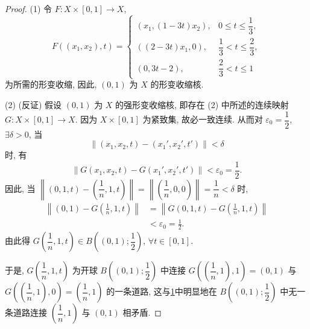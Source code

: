 \begin{proof}
(1) 令 $F\colon X \times [0, 1] \to X$,
\[
  F((x_{1}, x_{2}), t) = \begin{cases}
    (x_{1}, (1 - 3t)x_{2}), & 0 \leqslant t \leqslant \dfrac{1}{3},\\[6pt]
    ((2 - 3t)x_{1}, 0), & \dfrac{1}{3} < t \leqslant \dfrac{2}{3},\\[6pt]
    (0, 3t - 2), & \dfrac{2}{3} < t \leqslant 1
  \end{cases}
\]
为所需的形变收缩, 因此, $(0, 1)$ 为 $X$ 的形变收缩核.

(2) (反证) 假设 $(0, 1)$ 为 $X$ 的强形变收缩核, 即存在 (2) 中所述的连续映射 $G\colon X \times [0, 1] \to X$. 因为 $X \times [0, 1]$ 为紧致集, 故必一致连续. 从而对 $\varepsilon_{0} = \dfrac{1}{2}$, $\exists \delta > 0$, 当
\[
  \left\|(x_{1}, x_{2}, t) - (x_{1}', x_{2}', t')\right\| < \delta
\]
时, 有
\[
  \left\|G(x_{1}, x_{2}, t) - G(x_{1}', x_{2}', t')\right\| < \varepsilon_{0} = \frac{1}{2}.
\]
因此, 当 $\left\|(0, 1, t) - \left(\dfrac{1}{n}, 1, t\right)\right\| = \left\|\left(\dfrac{1}{n}, 0, 0\right)\right\| = \dfrac{1}{n} < \delta$ 时,
\[
  \begin{aligned}
    \left\|(0, 1) - G\left(\frac{1}{n}, 1, t\right)\right\| &= \left\|G(0, 1, t) - G\left(\frac{1}{n}, 1, t\right)\right\|\\
    &< \varepsilon_{0} = \frac{1}{2}.
  \end{aligned}
\]
由此得 $G\left(\dfrac{1}{n}, 1, t\right) \in B\left((0, 1); \dfrac{1}{2}\right)$, $\forall t \in [0, 1]$.

于是, $G\left(\dfrac{1}{n}, 1, t\right)$ 为开球 $B\left((0, 1); \dfrac{1}{2}\right)$ 中连接 $G\left(\left(\dfrac{1}{n}, 1\right), 1\right) = (0, 1)$ 与 $G\left(\left(\dfrac{1}{n}, 1\right), 0\right) = \left(\dfrac{1}{n}, 1\right)$ 的一条道路, 这与\cref{fig:7.4.2}中明显地在 $B\left((0, 1); \dfrac{1}{2}\right)$ 中无一条道路连接 $\left(\dfrac{1}{n}, 1\right)$ 与 $(0, 1)$ 相矛盾.
\end{proof}

\begin{figure}[htbp]
  \centering
  \caption{}\label{fig:7.4.2}
\end{figure}


